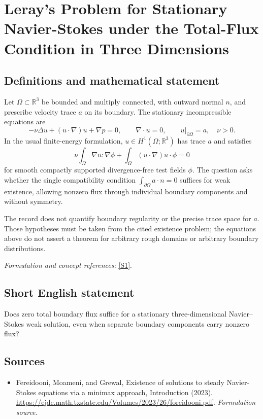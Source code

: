 \documentclass[11pt]{article}
\begin{document}
\section*{\texorpdfstring{Leray's Problem for Stationary Navier-Stokes under the Total-Flux Condition in Three Dimensions}{Leray's Problem for Stationary Navier-Stokes under the Total-Flux Condition in Three Dimensions}}\label{30006952}
\subsection{Definitions and mathematical statement}
Let $\Omega\subset{\mathbb{R}}^3$ be bounded and multiply connected, with outward normal $n$, and prescribe velocity trace $a$ on its boundary. The stationary incompressible equations are
\[
 -\nu\Delta u+(u\cdot\nabla)u+\nabla p=0,
 \qquad\nabla\cdot u=0,\qquad u|_{\partial\Omega}=a,
 \quad\nu>0.
\]
In the usual finite-energy formulation, $u\in H^1(\Omega;{\mathbb{R}}^3)$ has trace $a$ and satisfies
\[
 \nu\int_\Omega\nabla u:\nabla\phi
 +\int_\Omega (u\cdot\nabla)u\cdot\phi=0
\]
for smooth compactly supported divergence-free test fields $\phi$. The question asks whether the single compatibility condition $\int_{\partial\Omega}a\cdot n=0$ suffices for weak existence, allowing nonzero flux through individual boundary components and without symmetry.

The record does not quantify boundary regularity or the precise trace space for $a$. Those hypotheses must be taken from the cited existence problem; the equations above do not assert a theorem for arbitrary rough domains or arbitrary boundary distributions.
\par\smallskip\textit{Formulation and concept references:} \href{https://ejde.math.txstate.edu/Volumes/2023/26/foreidooni.pdf}{[S1]}.

\subsection{Short English statement}
Does zero total boundary flux suffice for a stationary three-dimensional Navier--Stokes weak solution, even when separate boundary components carry nonzero flux?
\subsection{Sources}
\begin{itemize}
\item[S1]Fereidooni, Moameni, and Grewal, Existence of solutions to steady Navier-Stokes equations via a minimax approach, Introduction (2023).
\url{https://ejde.math.txstate.edu/Volumes/2023/26/foreidooni.pdf}.
\textit{Formulation source.}
\end{itemize}
\end{document}
